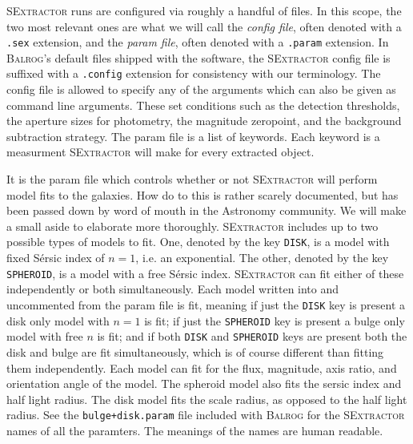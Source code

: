 \documentclass[12pt]{book}
\newcommand{\balrog}{\textsc{Balrog}}
\newcommand{\sex}{\textsc{SExtractor}}
\newcommand{\sersic}{S\'{e}rsic}
\begin{document}
\sex{} runs are configured via roughly a handful of files. 
In this scope, the two most relevant ones are what we will call
the \emph{config file}, often denoted with a \texttt{.sex} extension,
and the \emph{param file}, often denoted with a \texttt{.param} extension.
In \balrog{}'s default files shipped with the software, the \sex{} config
file is suffixed with a \texttt{.config} extension for consistency with our terminology.
The config file is allowed to specify any of the arguments which can
also be given as command line arguments.
These set conditions such as the detection thresholds,
the aperture sizes for photometry, the magnitude zeropoint,
and the background subtraction strategy.
The param file is a list of keywords.
Each keyword is a measurment \sex{} will make for every extracted object.

It is the param file which controls whether or not \sex{} will perform model fits to the galaxies. 
How do to this is rather scarely documented, but has been passed down by word of mouth in the Astronomy community. 
We will make a small aside to elaborate more thoroughly.
\sex{} includes up to two possible types of models to fit.
One, denoted by the key \texttt{DISK}, is a model with fixed \sersic{} index of $n=1$,
i.e. an exponential.
The other, denoted by the key \texttt{SPHEROID}, is a model with a free \sersic{} index.
\sex{} can fit either of these independently or both simultaneously.
Each model written into and uncommented from the param file is fit,
meaning if just the \texttt{DISK} key is present a disk only model with $n=1$ is fit;
if just the \texttt{SPHEROID} key is present a bulge only model with free $n$ is fit;
and if both \texttt{DISK} and \texttt{SPHEROID} keys are present both the
disk and bulge are fit simultaneously, which is of course different than fitting them independently.
Each model can fit for the flux, magnitude, axis ratio, and orientation angle of the model.
The spheroid model also fits the sersic index and half light radius.
The disk model fits the scale radius, as opposed to the half light radius.
See the \texttt{bulge+disk.param} file included with \balrog{} for the \sex{} names of all the paramters.
The meanings of the names are human readable.
\end{document}
